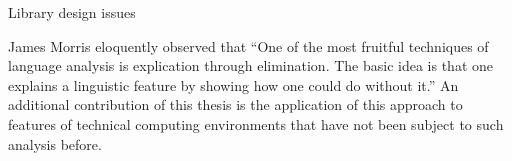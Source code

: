 


Library design issues

James Morris eloquently observed that
``One of the most fruitful techniques of language analysis is explication through
elimination. The basic idea is that one explains a linguistic feature by showing
how one could do without it.'' \cite{morris}
An additional contribution of this thesis is the application of this approach to features
of technical computing environments that have not been subject to such analysis
before.

